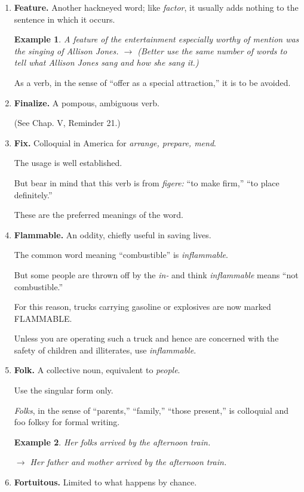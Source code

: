 \documentclass{book}
\numberwithin{equation}{section}
\newtheorem{example}{Example}[chapter]
\begin{document}
\begin{enumerate}
    You chase a ball \textit{farther} than the other fellow; you pursue a subject \textit{further}.
    \item \textbf{Feature.} Another hackneyed word; like \textit{factor}, it usually adds nothing to the sentence in which it occurs.
    \begin{example}
        A feature of the entertainment especially worthy of mention was the singing of Allison Jones.
        $\to$ (Better use the same number of words to tell what Allison Jones sang and how she sang it.)
    \end{example}
    As a verb, in the sense of ``offer as a special attraction,'' it is to be avoided.
    \item \textbf{Finalize.} A pompous, ambiguous verb.
    
    (See Chap. V, Reminder 21.)
    \item \textbf{Fix.} Colloquial in America for \textit{arrange, prepare, mend}.
    
    The usage is well established.
    
    But bear in mind that this verb is from \textit{figere:} ``to make firm,'' ``to place definitely.''
    
    These are the preferred meanings of the word.
    \item \textbf{Flammable.} An oddity, chiefly useful in saving lives.
    
    The common word meaning ``combustible'' is \textit{inflammable}.
    
    But some people are thrown off by the \textit{in-} and think \textit{inflammable} means ``not combustible.''
    
    For this reason, trucks carrying gasoline or explosives are now marked FLAMMABLE.
    
    Unless you are operating such a truck and hence are concerned with the safety of children and illiterates, use \textit{inflammable}.
    \item \textbf{Folk.} A collective noun, equivalent to \textit{people}.
    
    Use the singular form only.
    
    \textit{Folks}, in the sense of ``parents,'' ``family,'' ``those present,'' is colloquial and foo folksy for formal writing.
    \begin{example}
        Her folks arrived by the afternoon train.
        
        $\to$ Her father and mother arrived by the afternoon train.
    \end{example}
    \item \textbf{Fortuitous.} Limited to what happens by chance.
    

\end{enumerate}
\end{document}
